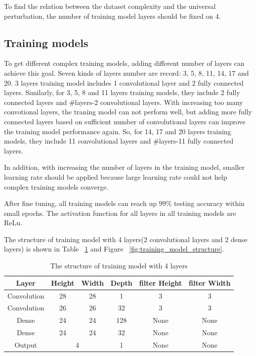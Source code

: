 \documentclass{article}
\begin{document}
To find the relation between the dataset complexity and the universal perturbation, the number of training model layers should be fixed on 4.
\subsection{Training models}

To get different complex training models, adding different number of layers can achieve this goal. Seven kinds of layers number are record: 3, 5, 8, 11, 14, 17 and 20. 3 layers training model includes 1 convolutional layer and 2 fully connected layers. Similarly, for 3, 5, 8 and 11 layers training models, they include 2 fully connected layers and \#layers-2 convolutional layers. With increasing too many convotional layers, the traning model can not perform well, but adding more fully connected layers based on sufficient number of convolutional layers can improve the training model performance again. So, for 14, 17 and 20 layers training models, they include 11 convolutional layers and \#layers-11 fully connected layers.

In addition, with increasing the number of layers in the training model, smaller learning rate should be applied because large learning rate could not help complex training models converge.

After fine tuning, all training models can reach up $99\%$ testing accuracy within small epochs. The activation function for all layers in all training models are ReLu. 

The structure of training model with 4 layers(2 convolutional layers and 2 dense layers) is shown in Table ~\ref{table:training_model_structure} and Figure ~\ref{fig:training_model_structure}.

\begin{table}
\begin{center}
\begin{tabular}{ |c|c|c|c|c|c| } 
\hline
Layer & Height & Width & Depth & filter Height & filter Width \\
\hline
Convolution & 28 & 28 & 1 & 3 & 3 \\ 
\hline
Convolution & 26 & 26 & 32 & 3 & 3 \\ 
\hline
Dense & 24 & 24 & 128 & None & None \\ 
\hline
Dense & 24 & 24 & 32 & None & None \\ 
\hline
Output & \multicolumn{2}{c}{4} & 1 & None & None \\ 
\hline
\end{tabular}
\end{center}
\caption{The structure of training model with 4 layers}
\label{table:training_model_structure}
\end{table}
\end{document}
